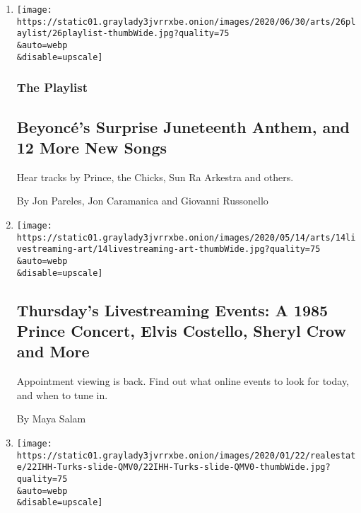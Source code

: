 \begin{enumerate}
\def\labelenumi{\arabic{enumi}.}
\item
  \href{/2020/06/26/arts/music/playlist-beyonce-prince.html}{}

  \texttt{[image: https://static01.graylady3jvrrxbe.onion/images/2020/06/30/arts/26playlist/26playlist-thumbWide.jpg?quality=75\\\&auto=webp\\\&disable=upscale]}

  \hypertarget{the-playlist}{%
  \subsubsection{The Playlist}\label{the-playlist}}

  \hypertarget{beyoncuxe9s-surprise-juneteenth-anthem-and-12-more-new-songs}{%
  \subsection{Beyoncé's Surprise Juneteenth Anthem, and 12 More New
  Songs}\label{beyoncuxe9s-surprise-juneteenth-anthem-and-12-more-new-songs}}

  Hear tracks by Prince, the Chicks, Sun Ra Arkestra and others.

  By Jon Pareles, Jon Caramanica and Giovanni Russonello
\item
  \href{/2020/05/14/arts/prince-concert-livestreaming-coronavirus.html}{}

  \texttt{[image: https://static01.graylady3jvrrxbe.onion/images/2020/05/14/arts/14livestreaming-art/14livestreaming-art-thumbWide.jpg?quality=75\\\&auto=webp\\\&disable=upscale]}

  \hypertarget{thursdays-livestreaming-events-a-1985-prince-concert-elvis-costello-sheryl-crow-and-more}{%
  \subsection{Thursday's Livestreaming Events: A 1985 Prince Concert,
  Elvis Costello, Sheryl Crow and
  More}\label{thursdays-livestreaming-events-a-1985-prince-concert-elvis-costello-sheryl-crow-and-more}}

  Appointment viewing is back. Find out what online events to look for
  today, and when to tune in.

  By Maya Salam
\item
  \href{/2020/01/22/realestate/house-hunting-in-turks-and-caicos-a-villa-on-the-beach-for-795000.html}{}

  \texttt{[image: https://static01.graylady3jvrrxbe.onion/images/2020/01/22/realestate/22IHH-Turks-slide-QMV0/22IHH-Turks-slide-QMV0-thumbWide.jpg?quality=75\\\&auto=webp\\\&disable=upscale]}


\end{enumerate}
